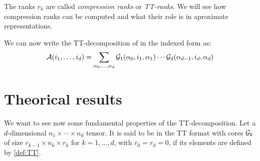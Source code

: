 The ranks $r_k$ are called \emph{compression ranks} or \emph{TT-ranks}. We will see how compression ranks can be computed and what their role is in aproximate representations.

We can now write the TT-decomposition of \A in the indexed form as:
\begin{equation} \label{def:TTindex}
  \mathcal{A}(i_1,\dots,i_d) = \sum_{\alpha_0,\dots,\alpha_d} \mathcal{G}_1(\alpha_0,i_1,\alpha_1) \cdots \mathcal{G}_d(\alpha_{d-1},i_d,\alpha_d)
\end{equation}

\section{Theorical results}
We want to see now some fundamental properties of the TT-decomposition. Let \A a $d$-dimensional $n_1 \times \cdots \times n_d$ tensor. It is said to be in the TT format with cores $\mathcal{G}_k$ of size $r_{k-1} \times n_k \times r_k$ for $k=1,\ldots ,d$, with $r_0 = r_d = 0$, if its elements are defined by \ref{def:TT}.

